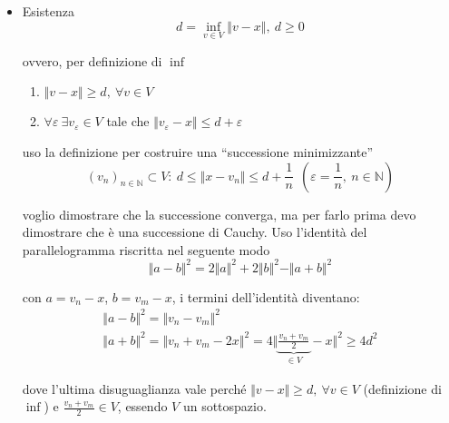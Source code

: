 \documentclass[10pt,a4paper,twoside,openright]{book}
\begin{document}
\begin{dimostrazione}

\begin{itemize}
\item Esistenza\begin{equation*}
d=\inf_{v\in V}\Vert v-x\Vert,\ d\geqslant 0
\end{equation*}

ovvero, per definizione di $\displaystyle \inf$
\begin{enumerate}
\item $\displaystyle \Vert v-x\Vert \geqslant d,\ \forall v\in V$
\item $\displaystyle \forall \varepsilon \ \exists v_{\varepsilon } \in V$ tale che $\displaystyle \Vert v_{\varepsilon } -x\Vert \leqslant d+\varepsilon $ \ $ $
\end{enumerate}

uso la definizione per costruire una ``successione minimizzante''
\begin{equation}
(v_{n})_{n\in \mathbb{N}} \subset V:\ d\leqslant \Vert x-v_{n}\Vert \leqslant d+\frac{1}{n} \ \ \left( \varepsilon =\frac{1}{n},\ n\in \mathbb{N}\right)
\label{eq:teo-proiez-suc-min}
\end{equation}

voglio dimostrare che la successione converga, ma per farlo prima devo dimostrare che è una successione di Cauchy. Uso l'identità del parallelogramma riscritta nel seguente modo\begin{equation*}
\Vert a-b\Vert ^{2} =2\Vert a\Vert ^{2} +2\Vert b\Vert ^{2} -\Vert a+b\Vert ^{2}
\end{equation*}

con $\displaystyle a=v_{n} -x$, $\displaystyle b=v_{m} -x$, i termini dell'identità diventano:\begin{equation*}
\begin{array}{ l }
\Vert a-b\Vert ^{2} =\Vert v_{n} -v_{m}\Vert ^{2}\\
\Vert a+b\Vert ^{2} =\Vert v_{n} +v_{m} -2x\Vert ^{2} =4\bigg\Vert \underbrace{\frac{v_{n} +v_{m}}{2}}_{\in V} -x\bigg\Vert ^{2} \geqslant 4d^{2}
\end{array}
\end{equation*}

dove l'ultima disuguaglianza vale perché $\displaystyle \Vert v-x\Vert \geqslant d,\ \forall v\in V$ (definizione di $\displaystyle \inf$) e $\displaystyle \frac{v_{n} +v_{m}}{2} \in V$, essendo $\displaystyle V$ un sottospazio.


\end{itemize}
\end{dimostrazione}
\end{document}
